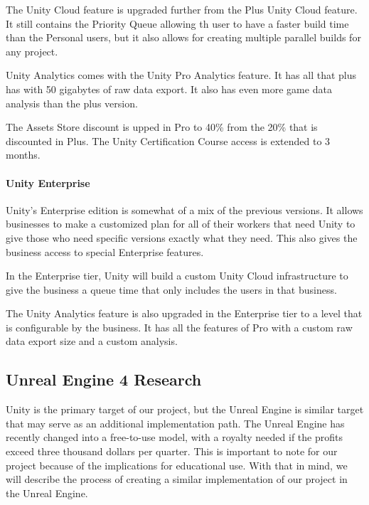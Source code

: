 \documentclass[12pt]{article}
\begin{document}
The Unity Cloud feature is upgraded further from the Plus Unity Cloud
feature. It still contains the Priority Queue allowing th user to have a
faster build time than the Personal users, but it also allows for
creating multiple parallel builds for any project.

Unity Analytics comes with the Unity Pro Analytics feature. It has all
that plus has with 50 gigabytes of raw data export. It also has even
more game data analysis than the plus version.

The Assets Store discount is upped in Pro to 40\% from the 20\% that is
discounted in Plus. The Unity Certification Course access is extended to
3 months. \autocite{unityTable}

\paragraph{Unity Enterprise}\label{unity-enterprise}

Unity's Enterprise edition is somewhat of a mix of the previous
versions. It allows businesses to make a customized plan for all of
their workers that need Unity to give those who need specific versions
exactly what they need. This also gives the business access to special
Enterprise features.

In the Enterprise tier, Unity will build a custom Unity Cloud
infrastructure to give the business a queue time that only includes the
users in that business.

The Unity Analytics feature is also upgraded in the Enterprise tier to a
level that is configurable by the business. It has all the features of
Pro with a custom raw data export size and a custom analysis.
\autocite{unityTable}

\subsection{Unreal Engine 4 Research}\label{unreal-engine-4-research}

Unity is the primary target of our project, but the Unreal Engine is
similar target that may serve as an additional implementation path. The
Unreal Engine has recently changed into a free-to-use model, with a
royalty needed if the profits exceed three thousand dollars per quarter.
This is important to note for our project because of the implications
for educational use. With that in mind, we will describe the process of
creating a similar implementation of our project in the Unreal Engine.
\end{document}
